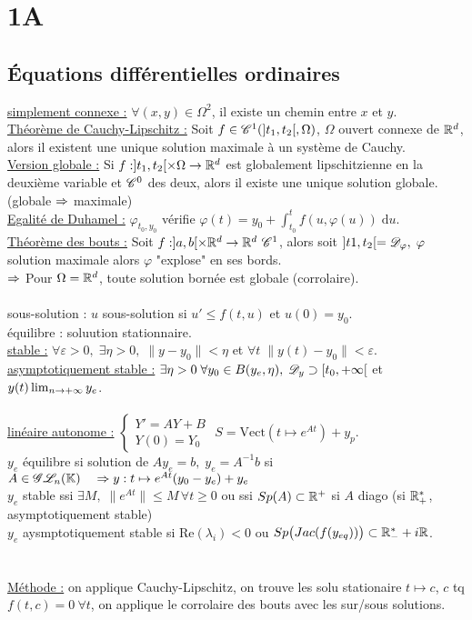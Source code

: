 \documentclass[12 pt]{book}
\begin{document}
\chapter*{1A}

\section*{Équations différentielles ordinaires}
\underline{simplement connexe :} $\forall (x,y)\in\Omega^2$, il existe un chemin entre $x$ et $y$.\\
\underline{Théorème de Cauchy-Lipschitz :} Soit $f\in\mathscr{C}^1(]t_1,t_2[,\Omega)$, $\Omega$ ouvert connexe de $\mathbb{R}^d$, alors il existent une unique solution maximale à un système de Cauchy.\\
\underline{Version globale :} Si $f:]t_1,t_2[\times \Omega \to \mathbb{R}^d$ est globalement lipschitzienne en la deuxième variable et $\mathscr{C}^0$ des deux, alors il existe une unique solution globale. \qquad (globale $\Rightarrow$ maximale)\\
\underline{Egalité de Duhamel :} $\varphi_{t_0,y_0}$ vérifie $\varphi(t) = y_0 +\int_{t_0}^t f(u,\varphi(u)) \; \text{d}u$.\\
\underline{Théorème des bouts :} Soit $f:]a,b[\times \mathbb{R}^d \to \mathbb{R}^d \ \mathscr{C}^1$, alors soit $]t1,t_2[ = \mathscr{D}_\varphi, \; \varphi$ solution maximale alors $\varphi$ "explose" en ses bords.\\
$\Rightarrow$ Pour $\Omega=\mathbb{R}^d$, toute solution bornée est globale (corrolaire).\\
\text{}\\
sous-solution : $u$ sous-solution si $u'\leqslant f(t,u)$ et $u(0)=y_0$.\\
équilibre : soluution stationnaire.\\
\underline{stable :} $\forall \varepsilon>0, \; \exists \eta >0, \; \|y-y_0\|<\eta$ et $\forall t \; \|y(t) - y_0\|<\varepsilon$.\\
\underline{asymptotiquement stable :} $\exists \eta >0 \; \forall y_0\in B(y_e,\eta), \; \mathscr{D}_y \supset [t_0,+\infty[$ et $y(t)\lim_{n\to +\infty} y_e$.\\
\text{}\\
\underline{linéaire autonome :} $\begin{cases} Y'=AY+B \\ Y(0) = Y_0 \end{cases}$ \qquad \qquad $S = \text{Vect}(t\mapsto e^{At}) +y_p$.\\
$y_e$ équilibre si solution de $Ay_e =b, \; y_e=A^{-1}b$ si $A\in\mathscr{G}\mathscr{L}_n(\mathbb{K}) \quad \Rightarrow y:t\mapsto e^{At}(y_0-y_e) + y_e$\\
$y_e$ stable ssi $\exists M, \; \|e^{At}\| \leqslant M \, \forall t\geqslant 0$ ou ssi $Sp(A)\subset \mathbb{R}^+$ si $A$ diago (si $\mathbb{R}_+^*$, asymptotiquement stable)\\
$y_e$ aysmptotiquement stable si Re$(\lambda_i)<0$ ou $Sp\big(Jac(f(y_{eq}))\big) \subset \mathbb{R}_-^* + i\mathbb{R}$.\\
\text{}\\
\text{}\\
\underline{Méthode :} on applique Cauchy-Lipschitz, on trouve les solu stationaire $t\mapsto c$, $c$ tq $f(t,c) = 0 \ \forall t$, on applique le corrolaire des bouts avec les sur/sous solutions.\\
\end{document}
